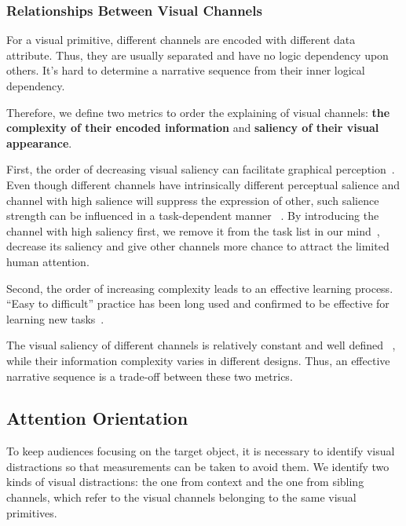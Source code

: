 \subsubsection{Relationships Between Visual Channels}
For a visual primitive, different channels are encoded with different data attribute. Thus, they are usually separated and have no logic dependency upon others. It's hard to determine a narrative sequence from their inner logical dependency. 

Therefore, we define two metrics to order the explaining of visual channels: \textbf{the complexity of their encoded information} and \textbf{saliency of their visual appearance}.

First, the order of decreasing visual saliency can facilitate graphical perception~\cite{cleveland_graphical_1984}. Even though different channels have intrinsically different perceptual salience and channel with high salience will suppress the expression of other, such salience strength can be influenced in a task-dependent manner ~\cite{nothdurft_salience_2000}. By introducing the channel with high saliency first, we remove it from the task list in our mind~\cite{itti2001computational}, decrease its saliency and give other channels more chance to attract the limited human attention. 

Second, the order of increasing complexity leads to an effective learning process. “Easy to difficult” practice has been long used and confirmed to be effective for learning new tasks~\cite{bliss_effects_1992}.
 
The visual saliency of different channels is relatively constant and  well defined ~\cite{munzner_visualization_2014,cleveland_graphical_1984}, while their information complexity varies in different designs. Thus, an effective narrative sequence is a trade-off between these two metrics. 


\subsection{Attention Orientation}
To keep audiences focusing on the target object, it is necessary to identify visual distractions so that measurements can be taken to avoid them. 
We identify two kinds of visual distractions: the one from context and the one from sibling channels, which refer to the visual channels belonging to the same visual primitives. 

